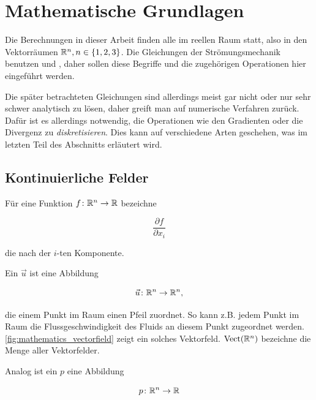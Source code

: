 \section{Mathematische Grundlagen}

Die Berechnungen in dieser Arbeit finden alle im reellen Raum statt, also in den
Vektorräumen $\mathbb{R}^n, n \in \{1,2,3\}$. Die Gleichungen der
Strömungsmechanik benutzen  und
, daher sollen diese Begriffe und die zugehörigen
Operationen hier eingeführt werden.

Die später betrachteten Gleichungen sind allerdings meist gar nicht oder nur sehr
schwer analytisch zu lösen, daher greift man auf numerische Verfahren zurück.
Dafür ist es allerdings notwendig, die Operationen wie den Gradienten oder die
Divergenz zu \emph{diskretisieren}. Dies kann auf verschiedene Arten geschehen,
was im letzten Teil des Abschnitts erläutert wird.

\subsection{Kontinuierliche Felder}

Für eine Funktion $f \colon \mathbb{R}^n \to \mathbb{R}$ bezeichne

\begin{equation}
\frac{\partial f}{\partial x_i}
\end{equation}

die  nach der $i$-ten Komponente.

Ein  $\vec{u}$ ist eine Abbildung

\begin{equation*}
\vec{u} \colon \mathbb{R}^n \to \mathbb{R}^n,
\end{equation*}

die einem Punkt im Raum einen Pfeil zuordnet. So kann z.B. jedem Punkt im Raum
die Flussgeschwindigkeit des Fluids an diesem Punkt zugeordnet werden.
\autoref{fig:mathematics_vectorfield} zeigt ein solches Vektorfeld.
$\operatorname*{Vect}(\mathbb{R}^n)$ bezeichne die Menge aller Vektorfelder.

Analog ist ein  $p$ eine Abbildung

\begin{equation*}
p \colon \mathbb{R}^n \to \mathbb{R}
\end{equation*}

